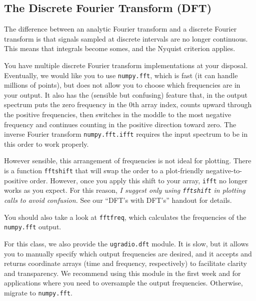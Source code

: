 \documentclass[12pt,preprint]{aastex}
\begin{document}
\subsection{The Discrete Fourier Transform (DFT)} \label{dft}

\noindent
The difference between an analytic Fourier transform and a discrete Fourier transform is
that signals sampled at discrete intervals are no longer continuous. This means that
integrals become somes, and the Nyquist criterion applies.

You have multiple discrete Fourier transform implementations at your disposal.  Eventually, we would like you
to use \verb$numpy.fft$, which is fast (it can handle millions of points), but does not allow you to choose
which frequencies are in your output. It also has the (sensible but confusing) feature that, in the output
spectrum puts the zero frequency in the 0th array index, counts upward through the positive frequencies, then
switches in the moddle to the most negative frequency and continues counting in the positive direction
toward zero.  The inverse Fourier transform \verb$numpy.fft.ifft$ requires the input spectrum to be in this
order to work properly.

However sensible, this arrangement of frequencies is not ideal for plotting. There is a function \verb$fftshift$
that will swap the order to a plot-friendly negative-to-positive order. However, once you apply this shift to
your array, \verb$ifft$ no longer works as you expect.  For this reason, {\it I suggest only using 
\verb$fftshift$ in plotting calls to avoid confusion.}
See our ``DFT's with DFT's'' handout for details.

You should also take a look at \verb$fftfreq$, which calculates the frequencies of the \verb$numpy.fft$ output.

For this class, we also provide the \verb$ugradio.dft$ module.  It is slow, but it allows you to manually specify
which output frequencies are desired, and it accepts and returns coordinate arrays (time and frequency, respectively)
to facilitate clarity and transparency. We recommend using this module in the first week and for applications where
you need to oversample the output frequencies. Otherwise, migrate to \verb$numpy.fft$.
\end{document}
